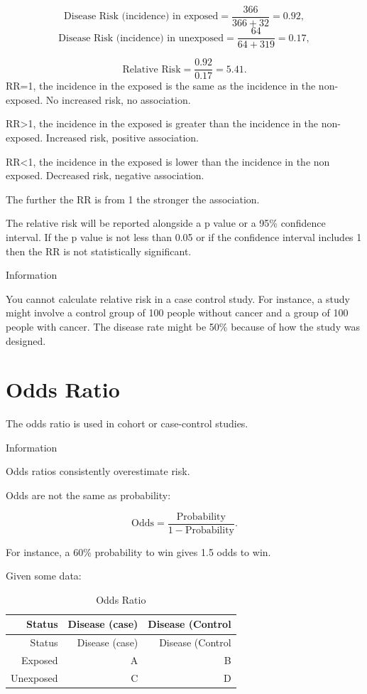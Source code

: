 \documentclass[
]{book}
\begin{document}
\[\textrm{Disease Risk (incidence) in exposed}=\frac{366}{366+32}=0.92,\]
\[\textrm{Disease Risk (incidence) in unexposed}=\frac{64}{64+319}=0.17,\]

\[\textrm{Relative Risk}=\frac{0.92}{0.17}=5.41.\]
RR=1, the incidence in the exposed is the same as the incidence in the non-exposed. No increased risk, no association.

RR\textgreater1, the incidence in the exposed is greater than the incidence in the non-exposed. Increased risk, positive association.

RR\textless1, the incidence in the exposed is lower than the incidence in the non exposed. Decreased risk, negative association.

The further the RR is from 1 the stronger the association.

The relative risk will be reported alongside a p value or a 95\% confidence interval. If the p value is not less than 0.05 or if the confidence interval includes 1 then the RR is not statistically significant.

Information

You cannot calculate relative risk in a case control study. For instance, a study might involve a control group of 100 people without cancer and a group of 100 people with cancer. The disease rate might be 50\% because of how the study was designed.

\hypertarget{odds-ratio}{%
\section{Odds Ratio}\label{odds-ratio}}

The odds ratio is used in cohort or case-control studies.

Information

Odds ratios consistently overestimate risk.

Odds are not the same as probability:

\[\textrm{Odds}=\frac{\textrm{Probability}}{1-\textrm{Probability}}.\]

For instance, a 60\% probability to win gives 1.5 odds to win.

Given some data:

\begin{longtable}[]{@{}rrr@{}}
\caption{\label{tab:table16} Odds Ratio}\tabularnewline
\toprule
Status & Disease (case) & Disease (Control \\
\midrule
\endfirsthead
\toprule
Status & Disease (case) & Disease (Control \\
\midrule
\endhead
Exposed & A & B \\
Unexposed & C & D \\
\bottomrule
\end{longtable}
\end{document}
